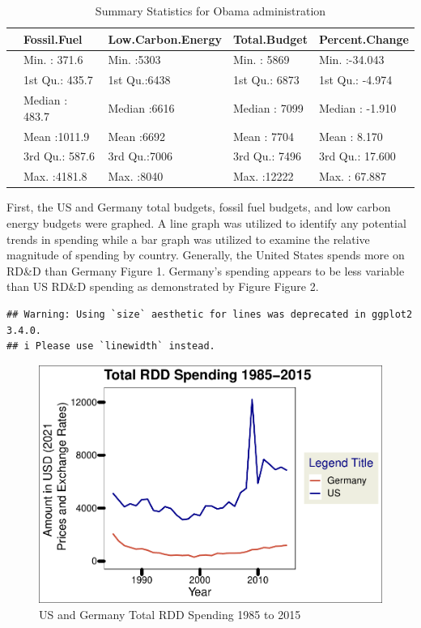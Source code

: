 \documentclass[
  12pt,
]{article}
\begin{document}
\begin{table}

\caption{\label{tab:calculating the summary statistics for US and Germany and creating tables}Summary Statistics for Obama administration}
\centering
\begin{tabular}[t]{l|l|l|l|l}
\hline
  &  Fossil.Fuel & Low.Carbon.Energy &  Total.Budget & Percent.Change\\
\hline
 & Min.   : 371.6 & Min.   :5303 & Min.   : 5869 & Min.   :-34.043\\
\hline
 & 1st Qu.: 435.7 & 1st Qu.:6438 & 1st Qu.: 6873 & 1st Qu.: -4.974\\
\hline
 & Median : 483.7 & Median :6616 & Median : 7099 & Median : -1.910\\
\hline
 & Mean   :1011.9 & Mean   :6692 & Mean   : 7704 & Mean   :  8.170\\
\hline
 & 3rd Qu.: 587.6 & 3rd Qu.:7006 & 3rd Qu.: 7496 & 3rd Qu.: 17.600\\
\hline
 & Max.   :4181.8 & Max.   :8040 & Max.   :12222 & Max.   : 67.887\\
\hline
\end{tabular}
\end{table}

First, the US and Germany total budgets, fossil fuel budgets, and low
carbon energy budgets were graphed. A line graph was utilized to
identify any potential trends in spending while a bar graph was utilized
to examine the relative magnitude of spending by country. Generally, the
United States spends more on RD\&D than Germany Figure 1. Germany's
spending appears to be less variable than US RD\&D spending as
demonstrated by Figure Figure 2.

\newpage

\begin{verbatim}
## Warning: Using `size` aesthetic for lines was deprecated in ggplot2 3.4.0.
## i Please use `linewidth` instead.
\end{verbatim}

\begin{figure}
\centering
\includegraphics{Chang_Jenkins_Mullens_ENV872_Final_files/figure-latex/Germany and US Line Plot for total budget-1.pdf}
\caption{US and Germany Total RDD Spending 1985 to 2015}
\end{figure}
\end{document}
